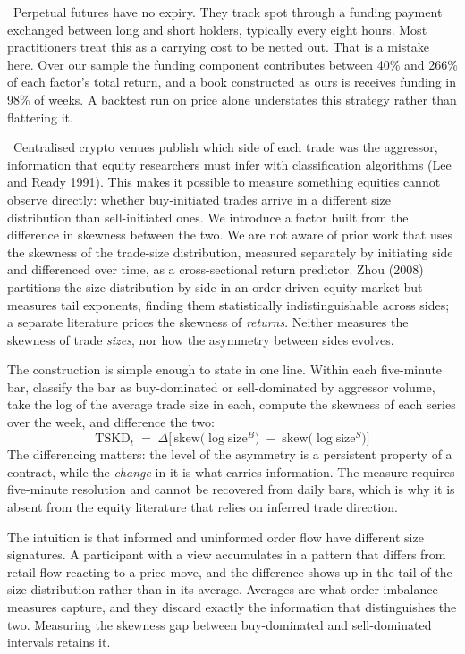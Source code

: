 \documentclass[12pt]{article}
\newcommand{\runin}[1]{\par\vspace{2pt}\noindent\hspace*{0.5in}{\bfseries #1}\ \ignorespaces}
\begin{document}
\runin{Funding is a return, not a fee.}Perpetual futures have no expiry. They track spot through a funding payment
exchanged between long and short holders, typically every eight hours. Most
practitioners treat this as a carrying cost to be netted out. That is a mistake
here. Over our sample the funding component contributes between 40\% and 266\% of
each factor's total return, and a book constructed as ours is receives funding in
98\% of weeks. A backtest run on price alone understates this strategy rather than
flattering it.

\runin{Aggressor-side information is published.}Centralised crypto venues publish which side of each trade was the aggressor,
information that equity researchers must infer with classification algorithms
(Lee and Ready 1991). This makes it possible to measure something equities cannot
observe directly: whether buy-initiated trades arrive in a different size
distribution than sell-initiated ones. We introduce a factor built from
the difference in skewness between the two. We are not aware of prior work that
uses the skewness of the trade-size distribution, measured separately by
initiating side and differenced over time, as a cross-sectional return predictor.
Zhou (2008) partitions the size distribution by side in an order-driven equity
market but measures tail exponents, finding them statistically indistinguishable
across sides; a separate literature prices the skewness of \emph{returns}. Neither
measures the skewness of trade \emph{sizes}, nor how the asymmetry between sides
evolves.

The construction is simple enough to state in one line. Within each five-minute
bar, classify the bar as buy-dominated or sell-dominated by aggressor volume,
take the log of the average trade size in each, compute the skewness of each
series over the week, and difference the two:
%
\begin{equation*}
\text{TSKD}_t \;=\; \Delta\Big[\,\mathrm{skew}\big(\log \text{size}^{B}\big)
 \;-\; \mathrm{skew}\big(\log \text{size}^{S}\big)\Big]
\end{equation*}
%
The differencing matters: the level of the asymmetry is a persistent property of a
contract, while the \emph{change} in it is what carries information. The measure
requires five-minute resolution and cannot be recovered from daily bars, which is
why it is absent from the equity literature that relies on inferred trade
direction.

The intuition is that informed and uninformed order flow have different size
signatures. A participant with a view accumulates in a pattern that differs from
retail flow reacting to a price move, and the difference shows up in the tail of
the size distribution rather than in its average. Averages are what order-imbalance
measures capture, and they discard exactly the information that distinguishes the
two. Measuring the skewness gap between buy-dominated and sell-dominated intervals
retains it.
\end{document}
